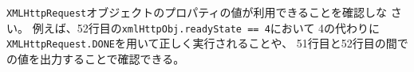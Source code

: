 \begin{Prob}\upshape
 \texttt{XMLHttpRequest}オブジェクトのプロパティの値が利用できることを確認しな
 さい。
 \ifText 例えば、52行目の\Verb+xmlHttpObj.readyState == 4+において
 4の代わりに\texttt{XMLHttpRequest.DONE}を用いて正しく実行されることや、
 51行目と52行目の間での値を出力することで確認できる。
 \fi
\end{Prob}

